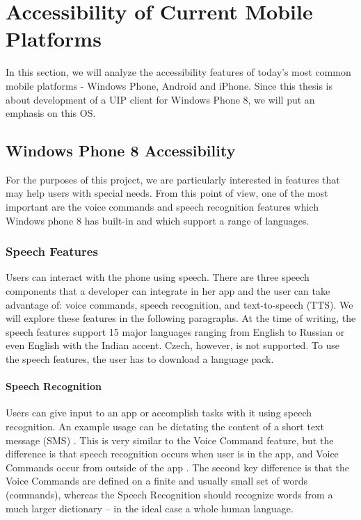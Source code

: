 \section{Accessibility of Current Mobile Platforms}
In this section, we will analyze the accessibility features of today's most common mobile platforms - Windows Phone, Android and iPhone. Since this thesis is about development of a UIP client for Windows Phone 8, we will put an emphasis on this OS.

\subsection{Windows Phone 8 Accessibility}
For the purposes of this project, we are particularly interested in features that may help users with special needs. From this point of view, one of the most important are the voice commands and speech recognition features which Windows phone 8 has built-in and which support a range of languages.

\subsubsection{Speech Features}
Users can interact with the phone using speech. There are three speech components that a developer can integrate in her app and the user can take advantage of: voice commands, speech recognition, and text-to-speech (TTS). We will explore these features in the following paragraphs.
At the time of writing, the speech features support 15 major languages ranging from English to Russian or even English with the Indian accent. Czech, however, is not supported. To use the speech features, the user has to download a language pack.

\paragraph{Speech Recognition}
Users can give input to an app or accomplish tasks with it using speech recognition. An example usage can be dictating the content of a short text message (SMS) \cite{phone8speech}. This is very similar to the Voice Command feature, but the difference is that speech recognition occurs when user is in the app, and Voice Commands occur from outside of the app \cite{phone8speech}. The second key difference is that the Voice Commands are defined on a finite and usually small set of words (commands), whereas the Speech Recognition should recognize words from a much larger dictionary – in the ideal case a whole human language.


